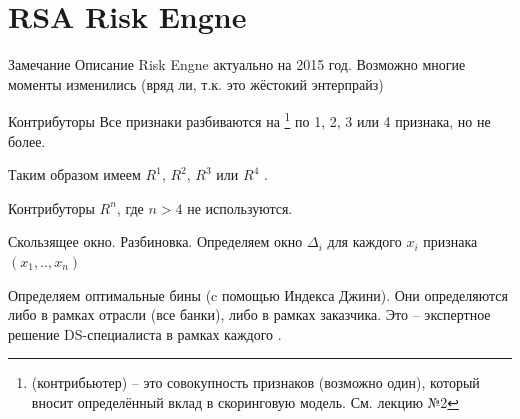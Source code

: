 \section{RSA Risk Engne}\label{section:risk_engine}

\begin{frame}
	\begin{block}{Замечание}
	Описание Risk Engne актуально на 2015 год. Возможно многие моменты изменились 
	(вряд ли, т.к. это жёстокий энтерпрайз)
	\end{block}
\end{frame}


\begin{frame}{Контрибуторы}
	Все признаки разбиваются на 
	\footnote{ (контрибьютер) -- это совокупность признаков (возможно один),
	который вносит определённый вклад в скоринговую модель. См. лекцию №2}
	по 1, 2, 3 или 4 признака, но не более. 
	
	Таким образом имеем $R^1$, $R^2$, $R^3$ или $R^4$ .
	
	Контрибуторы $R^n$, где $n>4$ не используются.	
\end{frame}

\begin{frame}{Скользящее окно. Разбиновка.}
	\footnotesize
	Определяем окно $\Delta_i$ для каждого $x_i$ признака 
	$(x_1, .., x_n)$
	\begin{center}
		\begin{tikzpicture}[scale=1.5]
			
		\end{tikzpicture}
	\end{center}
	Определяем оптимальные бины (c помощью Индекса Джини).
	Они определяются либо в рамках отрасли (все банки), либо в рамках заказчика.
	Это -- экспертное решение DS-специалиста в рамках каждого .
\end{frame}

\begin{frame}
	\Large
\end{frame}


